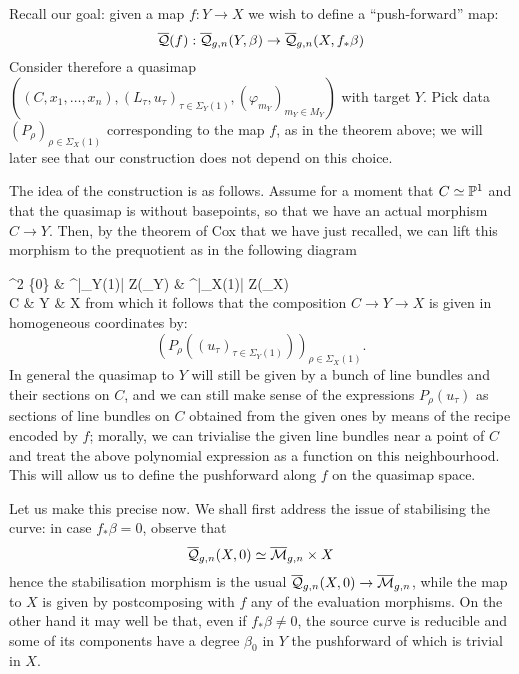 Recall our goal: given a map $f \colon Y \to X$ we wish to define a ``push-forward'' map:
\begin{equation*} \overline{\mathcal{Q}}(f) : \overline{\mathcal Q}_{g,n}(Y,\beta) \rightarrow \overline{\mathcal Q}_{g,n}(X,f_*\beta) \end{equation*}
Consider therefore a quasimap $((C,x_1,\ldots,x_n), (L_\tau, u_\tau)_{\tau \in \Sigma_Y(1)}, (\varphi_{m_Y})_{m_Y \in M_Y})$ with target $Y$. Pick data $(P_\rho)_{\rho \in \Sigma_X(1)}$ corresponding to the map $f$, as in the theorem above; we will later see that our construction does not depend on this choice.

The idea of the construction is as follows. Assume for a moment that $C\simeq\mathbb P^1$ and that the quasimap is without basepoints, so that we have an actual morphism $C \to Y$. Then, by the theorem of Cox that we have just recalled, we can lift this morphism to the prequotient as in the following diagram

\bcd
\Aaff^{2} \setminus \{0\} \ar[r, "(u_\tau)"] \ar[d] & \Aaff^{|\Sigma_Y(1)|} \setminus Z(\Sigma_Y) \ar[r, "(P_\rho)"] \ar[d] & \Aaff^{|\Sigma_X(1)|} \setminus Z(\Sigma_X) \ar[d] \\
C \ar[r] & Y \ar[r] & X
\ecd
from which it follows that the composition $C \to Y \to X$ is given in homogeneous coordinates by:
\begin{equation*} (P_\rho((u_\tau)_{\tau \in \Sigma_Y(1)}))_{\rho \in \Sigma_X(1)}. \end{equation*}
In general the quasimap to $Y$ will still be given by a bunch of line bundles and their sections on $C$, and we can still make sense of the expressions $P_\rho(u_\tau)$ as sections of line bundles on $C$ obtained from the given ones by means of the recipe encoded by $f$; morally, we can trivialise the given line bundles near a point of $C$ and treat the above polynomial expression as a function on this neighbourhood. This will allow us to define the pushforward along $f$ on the quasimap space.

Let us make this precise now. We shall first address the issue of stabilising the curve: in case $f_*\beta=0$, observe that
\[
 \overline{\mathcal Q}_{g,n}(X,0)\simeq \overline{\mathcal{M}}_{g,n}\times X
\]
hence the stabilisation morphism is the usual $\overline{\mathcal Q}_{g,n}(X,0)\rightarrow \overline{\mathcal{M}}_{g,n}$, while the map to $X$ is given by postcomposing with $f$ any of the evaluation morphisms. On the other hand it may well be that, even if $f_*\beta\neq 0$, the source curve is reducible and some of its components have a degree $\beta_0$ in $Y$ the pushforward of which is trivial in $X$.

